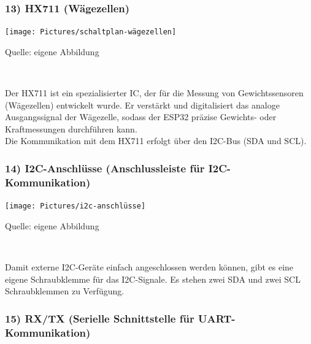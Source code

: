 \documentclass[ngerman,12pt,a4paper]{article}
\begin{document}
		\subsubsection*{13) HX711 (Wägezellen)}
		
		\begin{center} 
			\begin{minipage}[t]{0.65\textwidth}
				\texttt{[image: Pictures/schaltplan-wägezellen]}
				\label{fig:schaltplan-wägezellen}
				\vspace{-10pt}
				\begin{center}
					\par\small Quelle: eigene Abbildung
				\end{center}
			\end{minipage} \\[0.75cm]
		\end{center}
		Der HX711 ist ein spezialisierter IC, der für die Messung von Gewichtssensoren (Wägezellen) entwickelt wurde. Er verstärkt und digitalisiert das analoge Ausgangssignal der Wägezelle, sodass der ESP32 präzise Gewichts- oder Kraftmessungen durchführen kann. \\[0.5cm]
		Die Kommunikation mit dem HX711 erfolgt über den I2C-Bus (SDA und SCL).
		
		\subsubsection*{14) I2C-Anschlüsse (Anschlussleiste für I2C-Kommunikation)}
		
		\begin{center} 
			\begin{minipage}[t]{\textwidth}
				\texttt{[image: Pictures/i2c-anschlüsse]}
				\label{fig:i2c-anschlüsse}
				\vspace{-10pt}
				\begin{center}
					\par\small Quelle: eigene Abbildung
				\end{center}
			\end{minipage} \\[0.75cm]
		\end{center}
		Damit externe I2C-Geräte einfach angeschlossen werden können, gibt es eine eigene Schraubklemme für das I2C-Signale. Es stehen zwei SDA und zwei SCL Schraubklemmen zu Verfügung. 
		
	\subsubsection*{15) RX/TX (Serielle Schnittstelle für UART-Kommunikation)}
	
\end{document}
